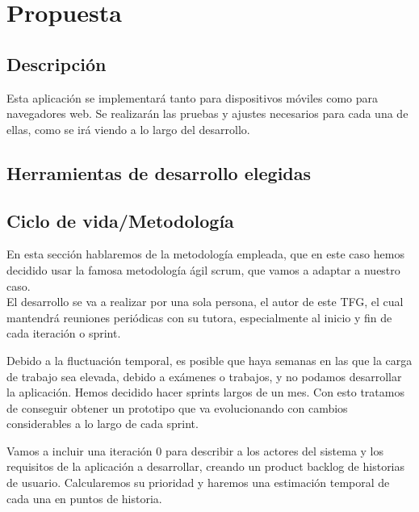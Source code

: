 \section{Propuesta}

\subsection{Descripción}
Esta aplicación se implementará tanto para dispositivos móviles como para navegadores web. Se realizarán las pruebas y ajustes necesarios para cada una de ellas, como se irá viendo a lo largo del desarrollo.
\subsection{Herramientas de desarrollo elegidas}

\subsection{Ciclo de vida/Metodología}
En esta sección hablaremos de la metodología empleada, que en este caso hemos decidido usar la famosa metodología ágil scrum, que vamos a adaptar a nuestro caso. \\

El desarrollo se va a realizar por una sola persona, el autor de este TFG, el cual mantendrá reuniones periódicas con su tutora, especialmente al inicio y fin de cada iteración o sprint.

Debido a la fluctuación temporal, es posible que haya semanas en las que la carga de trabajo sea elevada, debido a exámenes o trabajos, y no podamos desarrollar la aplicación. Hemos decidido hacer sprints largos de un mes. Con esto tratamos de conseguir obtener un prototipo que va evolucionando con cambios considerables a lo largo de cada sprint.

Vamos a incluir una iteración 0 para describir a los actores del sistema y los requisitos de la aplicación a desarrollar, creando un product backlog de historias de usuario. Calcularemos  su prioridad y haremos una estimación temporal de cada una en puntos de historia.  


